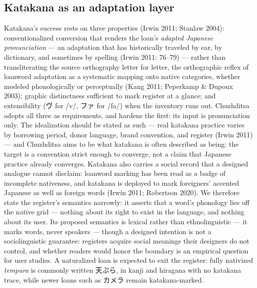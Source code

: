 \documentclass[12pt]{article}
\newcommand{\ph}[1]{{\ipafont/#1/}}
\newcommand{\src}[1]{{\ipafont #1}}
\begin{document}
\subsection{Katakana as an adaptation layer}
Katakana's success rests on three properties (Irwin 2011; Stanlaw 2004): conventionalized conversion that renders the loan's \emph{adapted Japanese pronunciation} — an adaptation that has historically traveled by ear, by dictionary, and sometimes by spelling (Irwin 2011: 76--79) — rather than transliterating the source orthography letter for letter, the orthographic reflex of loanword adaptation as a systematic mapping onto native categories, whether modeled phonologically or perceptually (Kang 2011; Peperkamp \& Dupoux 2003); graphic distinctness sufficient to mark register at a glance; and extensibility (\src{ヴ} for \ph{v}, \src{ファ} for \ph{fa}) when the inventory runs out. Chuzhditsa adopts all three as requirements, and hardens the first: its input is pronunciation only. The idealization should be stated as such — real katakana practice varies by borrowing period, donor language, brand convention, and register (Irwin 2011) — and Chuzhditsa aims to be what katakana is often described as being: the target is a convention strict enough to converge, not a claim that Japanese practice already converges. Katakana also carries a social record that a designed analogue cannot disclaim: loanword marking has been read as a badge of incomplete nativeness, and katakana is deployed to mark foreigners' accented Japanese as well as foreign words (Irwin 2011; Robertson 2020). We therefore state the register's semantics narrowly: it asserts that a word's phonology lies off the native grid — nothing about its right to exist in the language, and nothing about its user. Its proposed semantics is lexical rather than ethnolinguistic — it marks words, never speakers — though a designed intention is not a sociolinguistic guarantee: registers acquire social meanings their designers do not control, and whether readers would honor the boundary is an empirical question for user studies. A naturalized loan is expected to exit the register: fully nativized \emph{tempura} is commonly written \src{天ぷら}, in kanji and hiragana with no katakana trace, while newer loans such as \src{カメラ} remain katakana-marked.
\end{document}
